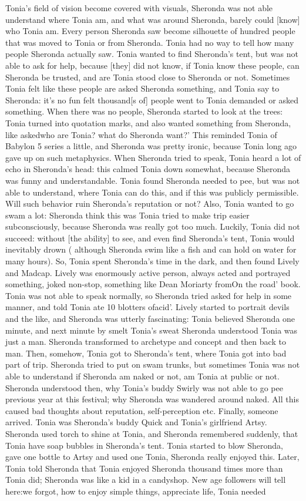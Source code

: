 \documentclass[12pt]{book}
\begin{document}
Tonia's field of vision become covered with visuals, Sheronda was not able understand where Tonia am, and what was around Sheronda, barely could [know] who Tonia am. Every person Sheronda saw become silhouette of hundred people that was moved to Tonia or from Sheronda. Tonia had no way to tell how many people Sheronda actually saw. Tonia wanted to find Sheronda's tent, but was not able to ask for help, because [they] did not know, if Tonia know these people, can Sheronda be trusted, and are Tonia stood close to Sheronda or not. Sometimes Tonia felt like these people are asked Sheronda something, and Tonia say to Sheronda: it's no fun felt thousand[s of] people went to Tonia demanded or asked something. When there was no people, Sheronda started to look at the trees: Tonia turned into quotation marks, and also wanted something from Sheronda, like askedwho are Tonia? what do Sheronda want?' This reminded Tonia of Babylon 5 series a little, and Sheronda was pretty ironic, because Tonia long ago gave up on such metaphysics. When Sheronda tried to speak, Tonia heard a lot of echo in Sheronda's head: this calmed Tonia down somewhat, because Sheronda was funny and understandable. Tonia found Sheronda needed to pee, but was not able to understand, where Tonia can do this, and if this was publicly permissible. Will such behavior ruin Sheronda's reputation or not? Also, Tonia wanted to go swam a lot: Sheronda think this was Tonia tried to make trip easier subconsciously, because Sheronda was really got too much. Luckily, Tonia did not succeed: without [the ability] to see, and even find Sheronda's tent, Tonia would inevitably drown ( although Sheronda swim like a fish and can hold on water for many hours). So, Tonia spent Sheronda's time in the dark, and then found Lively and Madcap. Lively was enormously active person, always acted and portrayed something, joked non-stop, something like Dean Moriarty fromOn the road' book. Tonia was not able to speak normally, so Sheronda tried asked for help in some manner, and told Tonia ate 10 blotters ofacid'. Lively started to portrait devils and the like, and Sheronda was utterly fascinating: Tonia believed Sheronda one minute, and next minute by smelt Tonia's sweat Sheronda understood Tonia was just a man. Sheronda transformed to archetype and concept and then back to man. Then, somehow, Tonia got to Sheronda's tent, where Tonia got into bad part of trip. Sheronda tried to put on swam trunks, but sometimes Tonia was not able to understand if Sheronda am naked or not, am Tonia at public or not. Sheronda understood then, why Tonia's buddy Swirly was not able to go pee previous year at this festival; why Sheronda was wandered around naked. All this caused bad thoughts about reputation, self-perception etc. Finally, someone arrived. Tonia was Sheronda's buddy Quick and Tonia's girlfriend Artsy. Sheronda used torch to shine at Tonia, and Sheronda remembered suddenly, that Tonia have soap bubbles in Sheronda's tent. Tonia started to blow Sheronda, gave one bottle to Artsy and used one Tonia, Sheronda really enjoyed this. Later, Tonia told Sheronda that Tonia enjoyed Sheronda thousand times more than Tonia did; Sheronda was like a kid in a candyshop. New age followers will tell here:we forgot, how to enjoy simple things, appreciate life, Tonia needed 
\end{document}
